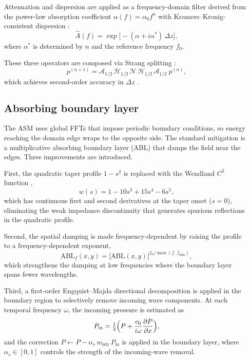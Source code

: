 \documentclass[11pt]{article}
\begin{document}
Attenuation and dispersion are applied as a frequency-domain filter
derived from the power-law absorption coefficient
$\alpha(f) = \alpha_0 f^n$ with Kramers--Kronig-consistent dispersion
\cite{pinton2009}:
\begin{equation}
  \hat{A}(f) = \exp\bigl[-(\alpha + i\alpha^*)\,\Delta z\bigr],
  \label{eq:attenuation}
\end{equation}
where $\alpha^*$ is determined by $n$ and the reference frequency
$f_0$.

These three operators are composed via Strang splitting
\cite{strang1968,leveque2002}:
\begin{equation}
  p^{(n+1)} = \mathcal{A}_{1/2}\,\mathcal{H}_{1/2}\,
  \mathcal{N}\,
  \mathcal{H}_{1/2}\,\mathcal{A}_{1/2}\;p^{(n)},
  \label{eq:strang}
\end{equation}
which achieves second-order accuracy in $\Delta z$
\cite{yoshida1990}.

\subsection{Absorbing boundary layer}

The ASM uses global FFTs that impose periodic boundary conditions, so
energy reaching the domain edge wraps to the opposite side.  The
standard mitigation is a multiplicative absorbing boundary layer (ABL)
that damps the field near the edges.  Three improvements are
introduced.

First, the quadratic taper profile $1 - s^2$ is replaced with the
Wendland $C^2$ function \cite{wendland1995},
\begin{equation}
  w(s) = 1 - 10s^3 + 15s^4 - 6s^5,
  \label{eq:wendland}
\end{equation}
which has continuous first and second derivatives at the taper onset
($s = 0$), eliminating the weak impedance discontinuity that generates
spurious reflections in the quadratic profile.

Second, the spatial damping is made frequency-dependent by raising the
profile to a frequency-dependent exponent,
\begin{equation}
  \mathrm{ABL}_f(x,y) = \bigl[\mathrm{ABL}(x,y)\bigr]^{f_0/\max(f,\,f_{\min})},
  \label{eq:freq_abl}
\end{equation}
which strengthens the damping at low frequencies where the boundary
layer spans fewer wavelengths.

Third, a first-order Engquist--Majda \cite{engquist1977} directional
decomposition is applied in the boundary region to selectively remove
incoming wave components.  At each temporal frequency $\omega$, the
incoming pressure is estimated as
\begin{equation}
  P_{\mathrm{in}} = \tfrac{1}{2}\Bigl(P + \frac{c_0}{i\omega}
  \frac{\partial P}{\partial x}\Bigr),
  \label{eq:engquist}
\end{equation}
and the correction $P \leftarrow P - \alpha_s\,w_{\mathrm{bdy}}\,
P_{\mathrm{in}}$ is applied in the boundary layer, where
$\alpha_s \in [0,1]$ controls the strength of the incoming-wave
removal.
\end{document}
